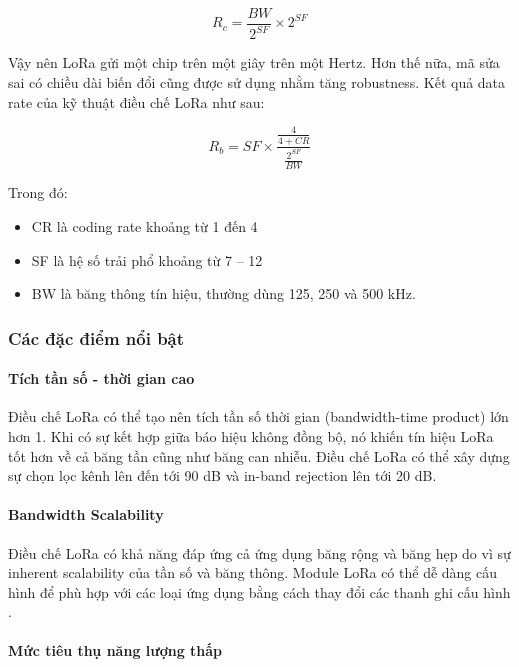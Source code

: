 \documentclass{article} %
\begin{document}
	\begin{equation} 
		R_c=\frac{B W}{2^{S F}} \times 2^{S F}
	\end{equation}
	
	Vậy nên LoRa gửi một chip trên một giây trên một Hertz. Hơn thế nữa, mã sửa sai có chiều dài biến đổi cũng được sử dụng nhằm tăng robustness. Kết quả data rate của kỹ thuật điều chế LoRa như sau\cite{semtech2015an1200}:
	
	\begin{equation}
		R_b=S F \times \frac{\frac{4}{4+C R}}{\frac{2^{S F}}{B W}}    
	\end{equation}
	
	Trong đó:
	\begin{itemize}
		\item CR là coding rate khoảng từ 1 đến 4
		\item SF là hệ số trải phổ khoảng từ 7 – 12
		\item BW là băng thông tín hiệu, thường dùng 125, 250 và 500 kHz.
	\end{itemize}
	
	\subsubsection{Các đặc điểm nổi bật }
	
	\paragraph{Tích tần số - thời gian cao}\mbox{}
	
	Điều chế LoRa có thể tạo nên tích tần số thời gian (bandwidth-time product) lớn hơn 1. Khi có sự kết hợp giữa báo hiệu không đồng bộ, nó khiến tín hiệu LoRa tốt hơn về cả băng tần cũng như băng can nhiễu. Điều chế LoRa có thể xây dựng sự chọn lọc kênh lên đến tới 90 dB và in-band rejection lên tới 20 dB\cite{semtech2015an1200}.
	
	\paragraph{Bandwidth Scalability}\mbox{}
	
	Điều chế LoRa có khả năng đáp ứng cả ứng dụng băng rộng và băng hẹp do vì sự inherent scalability của tần số và băng thông. Module LoRa có thể dễ dàng cấu hình để phù hợp với các loại ứng dụng bằng cách thay đổi các thanh ghi cấu hình
	\cite{semtech2015an1200}.
	
	\paragraph{Mức tiêu thụ năng lượng thấp}\mbox{}
	
\end{document}
